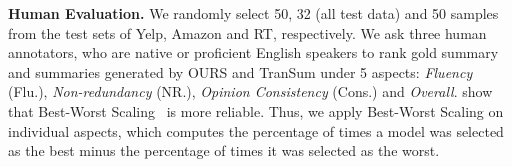\textbf{Human Evaluation.}
We randomly select 50, 32 (all test data) and 50 samples 
from the test sets of Yelp, Amazon and RT, respectively. 
We ask three 
human annotators,
who are native or proficient English speakers to 
rank gold summary and summaries 
generated by OURS and TranSum under 5 aspects:
{\em Fluency} (Flu.), {\em Non-redundancy} (NR.), {\em Opinion Consistency} (Cons.) and {\em Overall}.
\citet{bestworst16} show that Best-Worst Scaling~\cite{bestworst} is more reliable.
Thus, we apply Best-Worst Scaling on individual aspects, which computes the percentage of times a model was selected as the best minus the percentage of times it was selected as the worst.

